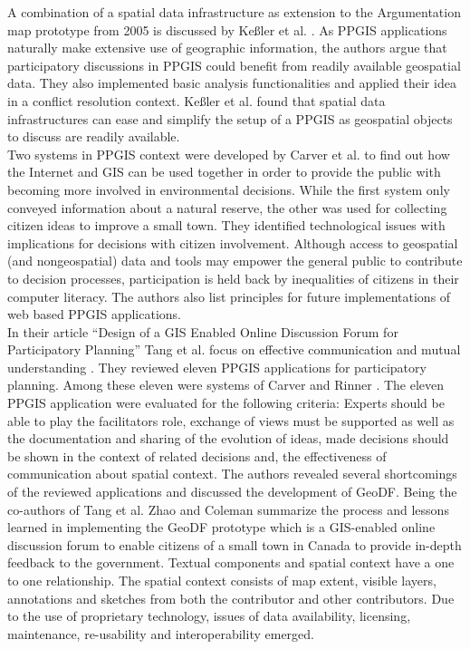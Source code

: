 A combination of a spatial data infrastructure as extension to the Argumentation map prototype from 2005 is discussed by Ke{\ss}ler et al. \cite{Kessler2005_Conflict_Resolution}. As PPGIS applications naturally make extensive use of geographic information, the authors argue that participatory discussions in PPGIS could benefit from readily available geospatial data. They also implemented basic analysis functionalities and applied their idea in a conflict resolution context. Ke{\ss}ler et al. found that spatial data infrastructures can ease and simplify the setup of a PPGIS as geospatial objects to discuss are readily available.\\
Two systems in PPGIS context were developed by Carver et al. \cite{Carver2001_PPGIS_Cyberdemocracy} to find out how the Internet and GIS can be used together in order to provide the public with becoming more involved in environmental decisions. While the first system only conveyed information about a natural reserve, the other was used for collecting citizen ideas to improve a small town. They identified technological issues with implications for decisions with citizen involvement. Although access to geospatial (and nongeospatial) data and tools may empower the general public to contribute to decision processes, participation is held back by inequalities of citizens in their computer literacy. The authors also list principles for future implementations of web based PPGIS applications.\\
In their article ``Design of a GIS Enabled Online Discussion Forum for Participatory Planning'' Tang et al. focus on effective communication and mutual understanding \cite{Tang2005_PPGIS_discussion_forum}. They reviewed eleven PPGIS applications for participatory planning. Among these eleven were systems of Carver \cite{Carver2001_PPGIS_Cyberdemocracy} and Rinner \cite{Rinner_ArgumentationMaps,Kessler2005_ArgumentationMapPrototype}. The eleven PPGIS application were evaluated for the following criteria: Experts should be able to play the facilitators role, exchange of views must be supported as well as the documentation and sharing of the evolution of ideas, made decisions should be shown in the context of related decisions and, the effectiveness of communication about spatial context. The authors revealed several shortcomings of the reviewed applications and discussed the development of GeoDF. Being the co-authors of Tang et al. \cite{Tang2005_PPGIS_discussion_forum} Zhao and Coleman \cite{zhao2006geodf} summarize the process and lessons learned in implementing the GeoDF prototype which is a GIS-enabled online discussion forum to enable citizens of a small town in Canada to provide in-depth feedback to the government. Textual components and spatial context have a one to one relationship. The spatial context consists of map extent, visible layers, annotations and sketches from both the contributor and other contributors. Due to the use of proprietary technology, issues of data availability, licensing, maintenance, re-usability and interoperability emerged.\\
